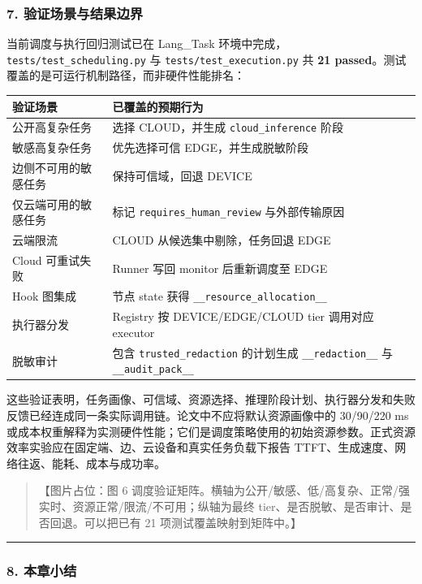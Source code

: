 \documentclass[UTF8,a4paper,12pt]{ctexart}
\begin{document}
\subsubsection{7. 验证场景与结果边界}

当前调度与执行回归测试已在 Lang\_Task 环境中完成，\texttt{tests/test\_scheduling.py} 与 \texttt{tests/test\_execution.py} 共 \textbf{21 passed}。测试覆盖的是可运行机制路径，而非硬件性能排名：

\begin{longtable}[]{@{}ll@{}}
\toprule
验证场景 & 已覆盖的预期行为 \\
\midrule
\endhead
公开高复杂任务 & 选择 CLOUD，并生成 \texttt{cloud\_inference} 阶段 \\
敏感高复杂任务 & 优先选择可信 EDGE，并生成脱敏阶段 \\
边侧不可用的敏感任务 & 保持可信域，回退 DEVICE \\
仅云端可用的敏感任务 & 标记 \texttt{requires\_human\_review} 与外部传输原因 \\
云端限流 & CLOUD 从候选集中剔除，任务回退 EDGE \\
Cloud 可重试失败 & Runner 写回 monitor 后重新调度至 EDGE \\
Hook 图集成 & 节点 state 获得 \texttt{\_\_resource\_allocation\_\_} \\
执行器分发 & Registry 按 DEVICE/EDGE/CLOUD tier 调用对应 executor \\
脱敏审计 & 包含 \texttt{trusted\_redaction} 的计划生成 \texttt{\_\_redaction\_\_} 与 \texttt{\_\_audit\_pack\_\_} \\
\bottomrule
\end{longtable}

这些验证表明，任务画像、可信域、资源选择、推理阶段计划、执行器分发和失败反馈已经连成同一条实际调用链。论文中不应将默认资源画像中的 30/90/220 ms 或成本权重解释为实测硬件性能；它们是调度策略使用的初始资源参数。正式资源效率实验应在固定端、边、云设备和真实任务负载下报告 TTFT、生成速度、网络往返、能耗、成本与成功率。

\begin{quote}
【图片占位：图 6 调度验证矩阵。横轴为公开/敏感、低/高复杂、正常/强实时、资源正常/限流/不可用；纵轴为最终 tier、是否脱敏、是否审计、是否回退。可以把已有 21 项测试覆盖映射到矩阵中。】
\end{quote}

\begin{center}\rule{0.5\linewidth}{0.5pt}\end{center}

\subsubsection{8. 本章小结}
\end{document}
